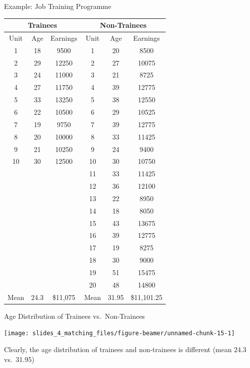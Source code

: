 \documentclass[
  ignorenonframetext,
  aspectratio=169, handout]{beamer}
\begin{document}
\begin{frame}{Example: Job Training Programme}
\protect\hypertarget{example-job-training-programme}{}
\scriptsize
\begin{center}
\begin{tabular}{|c c c|c c c|}
\hline
\multicolumn{3}{|c|}{Trainees} & \multicolumn{3}{|c|}{Non-Trainees} \\ \hline
Unit & Age & Earnings & Unit & Age & Earnings \\ \hline
1 & 18 & 9500 & 1 & 20 & 8500 \\ 
2 & 29 & 12250 & 2 & 27 & 10075 \\ 
3 & 24 & 11000 & 3 & 21 & 8725 \\ 
4 & 27 & 11750 & 4 & 39 & 12775 \\ 
5 & 33 & 13250 & 5 & 38 & 12550 \\ 
6 & 22 & 10500 & 6 & 29 & 10525 \\ 
7 & 19 & 9750 & 7 & 39 & 12775 \\ 
8 & 20 & 10000 & 8 & 33 & 11425 \\ 
9 & 21 & 10250 & 9 & 24 & 9400 \\ 
10 & 30 & 12500 & 10 & 30 & 10750 \\ 
\multicolumn{3}{|c|}{} & 11 & 33 & 11425 \\ 
\multicolumn{3}{|c|}{} & 12 & 36 & 12100 \\ 
\multicolumn{3}{|c|}{} & 13 & 22 & 8950 \\ 
\multicolumn{3}{|c|}{} & 14 & 18 & 8050 \\ 
\multicolumn{3}{|c|}{} & 15 & 43 & 13675 \\ 
\multicolumn{3}{|c|}{} & 16 & 39 & 12775 \\ 
\multicolumn{3}{|c|}{} & 17 & 19 & 8275 \\ 
\multicolumn{3}{|c|}{} & 18 & 30 & 9000 \\ 
\multicolumn{3}{|c|}{} & 19 & 51 & 15475 \\ 
\multicolumn{3}{|c|}{} & 20 & 48 & 14800 \\ \hline
Mean & 24.3 & \$11,075 & Mean & 31.95 & \$11,101.25 \\ \hline
\end{tabular}
\end{center}

\normalsize
\end{frame}

\begin{frame}{Age Distribution of Trainees vs.~Non-Trainees}
\protect\hypertarget{age-distribution-of-trainees-vs.-non-trainees}{}
\begin{center}\texttt{[image: slides\_4\_matching\_files/figure-beamer/unnamed-chunk-15-1]} \end{center}

Clearly, the age distribution of trainees and non-trainees is different
(mean 24.3 vs.~31.95)
\end{frame}
\end{document}

